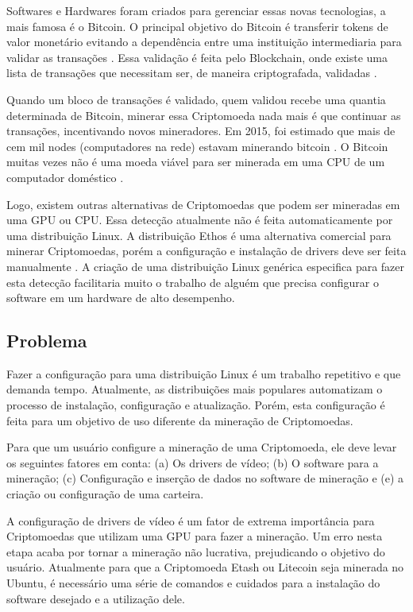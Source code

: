 \documentclass[
article,			%
12pt,				%
openright,			%
oneside,			%
a4paper,			%
chapter=TITLE,		%
section=TITLE,		%
subsection=TITLE,	%
subsubsection=TITLE,%
subsubsubsection=TITLE, %
english,			%
brazil,				%
]{abntex2}
\begin{document}
Softwares e Hardwares foram criados para gerenciar essas novas
tecnologias, a mais famosa é o Bitcoin. O principal objetivo do
Bitcoin é transferir tokens de valor monetário evitando a dependência
entre uma instituição intermediaria para validar as transações
\cite{Nakamoto2008}. Essa validação é feita pelo Blockchain, onde
existe uma lista de transações que necessitam ser, de maneira
criptografada, validadas \cite{Economist2015}.

Quando um bloco de transações é validado, quem validou recebe uma
quantia determinada de Bitcoin, minerar essa Criptomoeda nada mais é
que continuar as transações, incentivando novos mineradores. Em 2015,
foi estimado que mais de cem mil nodes (computadores na rede) estavam
minerando bitcoin \cite{Coin2015}. O Bitcoin muitas vezes não é uma
moeda viável para ser minerada em uma CPU de um computador doméstico
\cite{Bitcoins2018}.

Logo, existem outras alternativas de Criptomoedas que podem ser
mineradas em uma GPU ou CPU\@. Essa detecção atualmente não é feita
automaticamente por uma distribuição Linux. A distribuição Ethos é uma
alternativa comercial para minerar Criptomoedas, porém a configuração
e instalação de drivers deve ser feita manualmente \cite{EthOS2018}. A
criação de uma distribuição Linux genérica especifica para fazer esta
detecção facilitaria muito o trabalho de alguém que precisa configurar
o software em um hardware de alto desempenho.

\subsection{Problema}

Fazer a configuração para uma distribuição Linux é um trabalho
repetitivo e que demanda tempo. Atualmente, as distribuições mais
populares automatizam o processo de instalação, configuração e
atualização. Porém, esta configuração é feita para um objetivo de uso
diferente da mineração de Criptomoedas.

Para que um usuário configure a mineração de uma Criptomoeda, ele deve
levar os seguintes fatores em conta: (a) Os drivers de vídeo; (b) O
software para a mineração; (c) Configuração e inserção de dados no
software de mineração e (e) a criação ou configuração de uma carteira. 

A configuração de drivers de vídeo é um fator de extrema importância
para Criptomoedas que utilizam uma GPU para fazer a mineração. Um erro
nesta etapa acaba por tornar a mineração não lucrativa, prejudicando o
objetivo do usuário. Atualmente para que a Criptomoeda Etash ou
Litecoin seja minerada no Ubuntu, é necessário uma série de comandos e
cuidados para a instalação do software desejado e a utilização dele.
\end{document}
